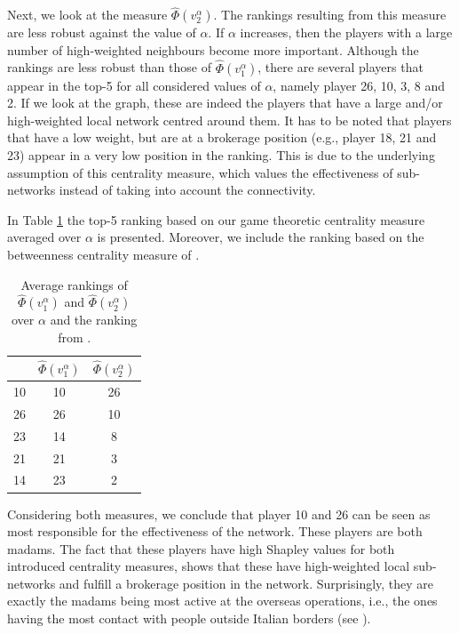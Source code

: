 \documentclass[10p]{article}
\theoremstyle{definition}
\theoremstyle{definition}
\begin{document}
Next, we look at the measure $\hat{\Phi}(v_2^\alpha)$. The rankings resulting from this measure are less robust against the value of $\alpha$. If $\alpha$ increases, then the players with a large number of high-weighted neighbours become more important. Although the rankings are less robust than those of $\hat{\Phi}(v_1^\alpha)$, there are several players that appear in the top-5 for all considered values of $\alpha$, namely player 26, 10, 3, 8 and 2. If we look at the graph, these are indeed the players that have a large and/or high-weighted local network centred around them. It has to be noted that players that have a low weight, but are at a brokerage position (e.g., player 18, 21 and 23) appear in a very low position in the ranking. This is due to the underlying assumption of this centrality measure, which values the effectiveness of sub-networks instead of taking into account the connectivity. 

In Table \ref{TableAverageRankings} the top-5 ranking based on our game theoretic centrality measure averaged over $\alpha$ is presented. Moreover, we include the ranking based on the betweenness centrality measure of \cite{mancuso2014not}.
\begin{table}[H]\centering
\begin{tabular}{*{3}{c}}
\toprule
\cite{mancuso2014not}
 & $\hat{\Phi}(v_1^\alpha)$ & $\hat{\Phi}(v_2^\alpha)$ \\
\midrule
10 & 10 & 26 \\ 
26 & 26 & 10\\ 
23 &14 & 8 \\ 
21 & 21& 3 \\ 
14 & 23& 2 \\ 
\bottomrule
\end{tabular}
\caption{Average rankings of $\hat{\Phi}(v_1^\alpha)$ and $\hat{\Phi}(v_2^\alpha)$ over $\alpha$ and the ranking from \cite{mancuso2014not}. \label{TableAverageRankings}}
\end{table}

\noindent Considering both measures, we conclude that player 10 and 26 can be seen as most responsible for the effectiveness of the network. These players are both madams. The fact that these players have high Shapley values for both introduced centrality measures, shows that these have high-weighted local sub-networks and fulfill a brokerage position in the network. Surprisingly, they are exactly the madams being most active at the overseas operations, i.e., the ones having the most contact with people outside Italian borders (see \cite{mancuso2014not}). 
\end{document}
